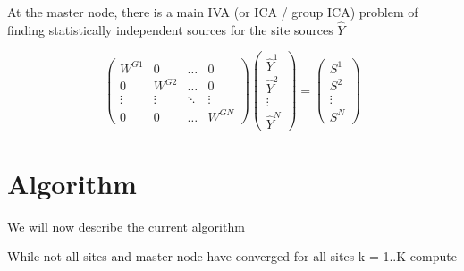 \documentclass{amsproc}
\begin{document}
At the master node, there is a main IVA (or ICA / group ICA) problem of finding statistically independent sources for the site sources $\hat{Y}$
        
\[
    \begin{pmatrix}
        W^{G1}  & 0         & \dots     & 0         \\
        0       & W^{G2}    & \dots     & 0         \\
        \vdots  & \vdots    & \ddots    & \vdots    \\
        0       & 0         & \dots     & W^{GN}
    \end{pmatrix}
    \begin{pmatrix}
        \hat{Y}^1   \\
        \hat{Y}^2   \\
        \vdots      \\
        \hat{Y}^N
    \end{pmatrix}
    =
    \begin{pmatrix}
        S^1     \\
        S^2     \\
        \vdots  \\
        S^N
    \end{pmatrix}
\]


\section{Algorithm} We will now describe the current algorithm

While not all sites and master node have converged 
    for all sites k = 1..K
        compute
\end{document}
